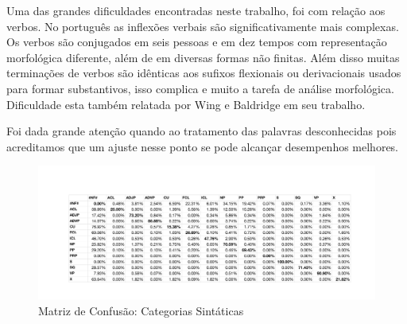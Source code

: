 Uma das grandes dificuldades encontradas neste trabalho, foi com relação aos verbos. No português as inflexões verbais são significativamente mais complexas. Os verbos são conjugados em seis pessoas e em dez tempos com representação morfológica diferente, além de em diversas formas não finitas. Além disso muitas terminações de verbos são idênticas aos sufixos flexionais ou derivacionais usados para formar substantivos, isso complica e muito a tarefa de análise morfológica. Dificuldade esta também relatada por Wing e Baldridge em seu trabalho.

Foi dada grande atenção quando ao tratamento das palavras desconhecidas pois acreditamos que um ajuste nesse ponto se pode alcançar desempenhos melhores.

\begin{figure}
  \begin{center}
	\includegraphics[scale=0.65]{score_confusion_cat.pdf}
	\caption{\label{confusion_matrix_cat} Matriz de Confusão: Categorias Sintáticas}		
  \end{center}
\end{figure}
